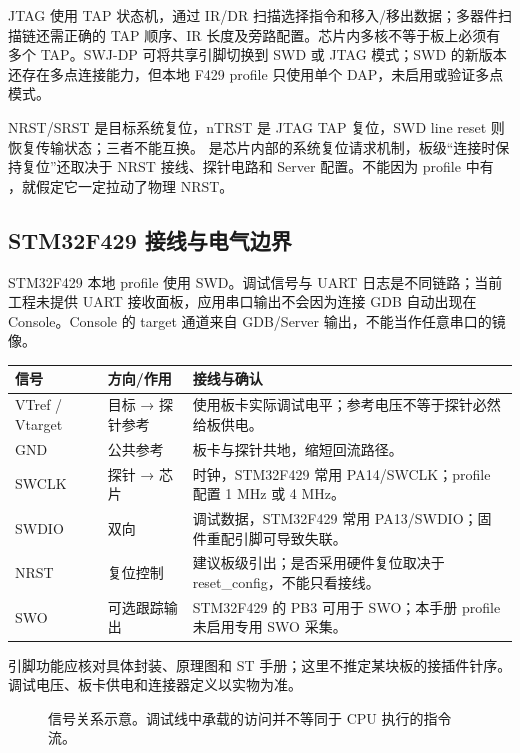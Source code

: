 \documentclass[UTF8,a4paper,11pt,oneside,fontset=none]{ctexart}
\newcommand{\code}[1]{\texttt{\detokenize{#1}}}
\begin{document}
JTAG 使用 TAP 状态机，通过 IR/DR 扫描选择指令和移入/移出数据；多器件扫描链还需正确的 TAP 顺序、IR 长度及旁路配置。芯片内多核不等于板上必须有多个 TAP。SWJ-DP 可将共享引脚切换到 SWD 或 JTAG 模式；SWD 的新版本还存在多点连接能力，但本地 F429 profile 只使用单个 DAP，未启用或验证多点模式。

NRST/SRST 是目标系统复位，nTRST 是 JTAG TAP 复位，SWD line reset 则恢复传输状态；三者不能互换。\code{SYSRESETREQ} 是芯片内部的系统复位请求机制，板级“连接时保持复位”还取决于 NRST 接线、探针电路和 Server 配置。不能因为 profile 中有 \code{reset halt}，就假定它一定拉动了物理 NRST。

\subsection{STM32F429 接线与电气边界}
STM32F429 本地 profile 使用 SWD。调试信号与 UART 日志是不同链路；当前工程未提供 UART 接收面板，应用串口输出不会因为连接 GDB 自动出现在 Console。Console 的 target 通道来自 GDB/Server 输出，不能当作任意串口的镜像。

\noindent\begin{tabularx}{\linewidth}{@{}P{25mm}P{28mm}Y@{}}\toprule
信号 & 方向/作用 & 接线与确认\\\midrule
VTref / Vtarget & 目标 → 探针参考 & 使用板卡实际调试电平；参考电压不等于探针必然给板供电。\\
GND & 公共参考 & 板卡与探针共地，缩短回流路径。\\
SWCLK & 探针 → 芯片 & 时钟，STM32F429 常用 PA14/SWCLK；profile 配置 1 MHz 或 4 MHz。\\
SWDIO & 双向 & 调试数据，STM32F429 常用 PA13/SWDIO；固件重配引脚可导致失联。\\
NRST & 复位控制 & 建议板级引出；是否采用硬件复位取决于 reset\_config，不能只看接线。\\
SWO & 可选跟踪输出 & STM32F429 的 PB3 可用于 SWO；本手册 profile 未启用专用 SWO 采集。\\\bottomrule
\end{tabularx}
引脚功能应核对具体封装、原理图和 ST 手册；这里不推定某块板的接插件针序。调试电压、板卡供电和连接器定义以实物为准。

\begin{figure}[H]\centering
{}
\caption{信号关系示意。调试线中承载的访问并不等同于 CPU 执行的指令流。}
\end{figure}
\end{document}
